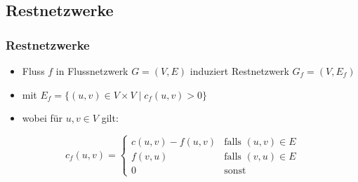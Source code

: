 \documentclass[draft]{beamer}
\begin{document}
\subsection{Restnetzwerke}
\begin{frame}
\frametitle{Restnetzwerke}
\begin{itemize}
\item Fluss $f$ in Flussnetzwerk $G=(V,E)$ induziert Restnetzwerk $G_{f}=(V,E_{f})$
\item mit $E_f = \{ (u,v) \in V \times V \mid c_{f}(u,v) > 0\}$
\item wobei für $u,v \in V$ gilt: 
\end{itemize}
\begin{equation}
c_{f}(u,v) = 
\begin{cases}
c(u,v) - f(u,v) & \text{falls $(u,v)\in E$}\\
f(v,u) & \text{falls $(v,u) \in E$}\\
0 & \text{sonst}
\end{cases}
\nonumber
\end{equation}
\end{frame}
\end{document}
